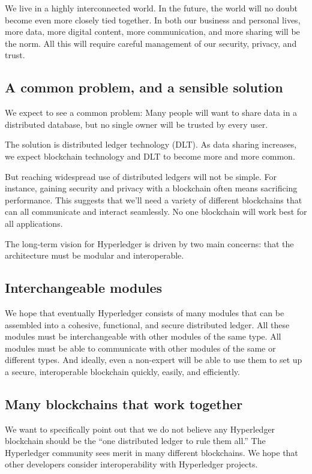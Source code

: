 We live in a highly interconnected world. 
In the future, the world will no doubt become even more closely tied together.
In both our business and personal lives, more data, more digital content, more communication, and more sharing will be the norm. 
All this will require careful management of our security, privacy, and trust. 

\subsection{A common problem, and a sensible solution}
We expect to see a common problem: Many people will want to share data in a distributed database, but no single owner will be trusted by every user. 

The solution is distributed ledger technology (DLT). 
As data sharing increases, we expect blockchain technology and DLT to become more and more common.

But reaching widespread use of distributed ledgers will not be simple. 
For instance, gaining security and privacy with a blockchain often means sacrificing  performance. 
This suggests that we'll need a variety of different blockchains that can all communicate and interact seamlessly.
No one blockchain will work best for all applications.

The long-term vision for Hyperledger is driven by two main concerns: that the architecture must be modular and interoperable.

\subsection{Interchangeable modules}
We hope that eventually Hyperledger consists of many modules that can be assembled into a cohesive, functional, and secure distributed ledger. 
All these modules must be interchangeable with other modules of the same type. 
All modules must be able to communicate with other modules of the same or different types. 
And ideally, even a non-expert will be able to use them to set up a secure, interoperable blockchain quickly, easily, and efficiently.

\subsection{Many blockchains that work together}
We want to specifically point out that we do not believe any Hyperledger blockchain should be the ``one distributed ledger to rule them all.'' 
The Hyperledger community sees merit in many different blockchains. 
We hope that other developers consider interoperability with Hyperledger projects. 

